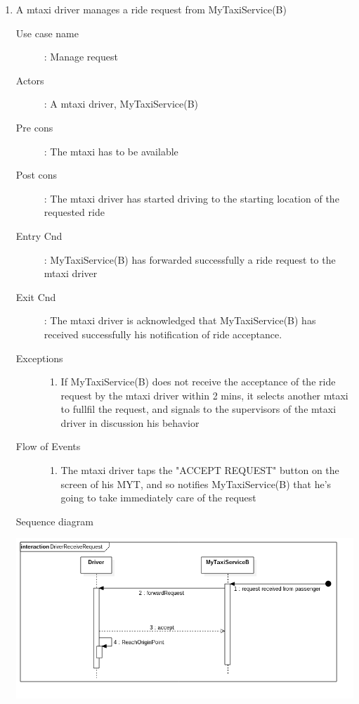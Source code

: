 \documentclass[11pt,titlepage]{article} %
\begin{document}
\begin{enumerate}
	        \item A mtaxi driver manages a ride request from MyTaxiService(B)
		\begin{description}
		        \item [Use case name]: Manage request
		        \item [Actors]: A mtaxi driver, MyTaxiService(B)
		        \item [Pre cons]: The mtaxi has to be available
		        \item [Post cons]: The mtaxi driver has started driving to the starting location of the requested ride
		        \item [Entry Cnd]: MyTaxiService(B) has forwarded successfully a ride request to the mtaxi driver
		        \item [Exit Cnd]: The mtaxi driver is acknowledged that MyTaxiService(B) has received successfully his notification
		        of ride acceptance.
		        \item [Exceptions]\hfill
			\begin{enumerate}
			          \item If MyTaxiService(B) does not receive the acceptance of the ride request by the mtaxi driver
			          within 2 mins, it selects another mtaxi to fullfil the request, and signals to the supervisors
			          of the mtaxi driver in discussion his behavior
			\end{enumerate}
		        \item [Flow of Events]\hfill
			\begin{enumerate}
			          \item The mtaxi driver taps the "ACCEPT REQUEST" button on the screen of his MYT, and so notifies MyTaxiService(B)
			          that he's going to take immediately care of the request
			\end{enumerate}
		\end{description}
		\newpage
		Sequence diagram
		\begin{center}
		\includegraphics[scale=0.52]{usecase5.png}
		\end{center}



\end{enumerate}
\end{document}
